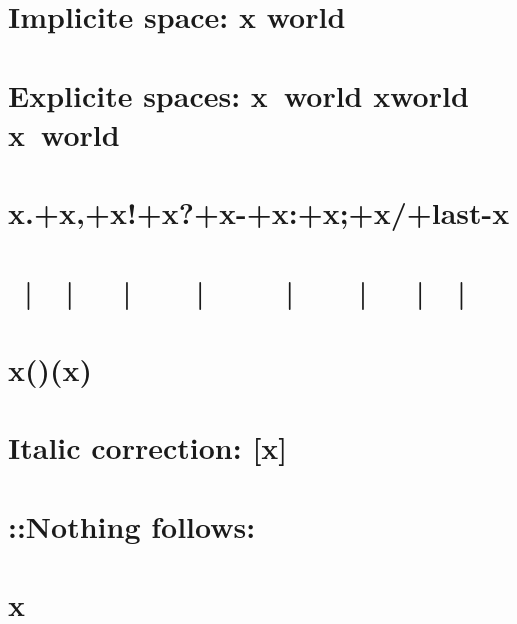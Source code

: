 \documentclass[12pt]{article}
\newcommand{\x}{x\xspace}
\begin{document}
  \section{Implicite space: \x world}
  \section{Explicite spaces: \x\ world \x\space world \x~world}
  \section{\x.+\x,+\x!+\x?+\x-+\x:+\x;+\x/+last-\x}
  \makeatletter
  \section{~|~~|~~~|~~~~|~~~~~|~~~~|~~~|~~|~}
  \section{\x()(\x) }
  \section{Italic correction: [\x\/]}
  \section{::Nothing follows:}
  \section{}
  \section{\x}
\end{document}
